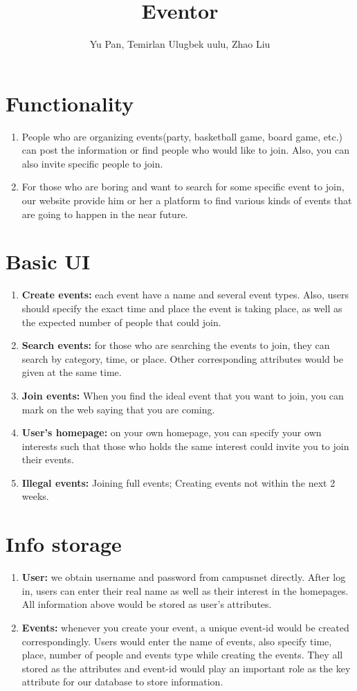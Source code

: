 \documentclass{article}
\author{Yu Pan, Temirlan Ulugbek uulu, Zhao Liu}
\title{Eventor}
\begin{document}
	\maketitle
	\section*{Functionality}
	\begin{enumerate}
		\item People who are organizing events(party, basketball game, board game, etc.) can post the information or find people who would like to join. Also, you can also invite specific people to join.
		\item For those who are boring and want to search for some specific event to join, our website provide him or her a platform to find various kinds of events that are going to happen in the near future.
	\end{enumerate}
	\section*{Basic UI}
	\begin{enumerate}
		\item \textbf{Create events:} each event have a name and several event types. Also, users should specify the exact time and  place the event is taking place, as well as the expected number of people that could join.
		\item \textbf{Search events:} for those who are searching the events to join, they can search by category, time, or place. Other corresponding attributes would be given at the same time.
		\item \textbf{Join events:} When you find the ideal event that you want to join, you can mark on the web saying that you are coming.
		\item \textbf{User's homepage:} on your own homepage, you can specify your own interests such that those who holds the same interest could invite you to join their events.
		\item \textbf{Illegal events:} Joining full events; Creating events not within the next 2 weeks.
	\end{enumerate}
	\section*{Info storage}
	\begin{enumerate}
		\item \textbf{User:} we obtain username and password from campusnet directly. After log in, users can enter their real name as well as their interest in the homepages. All information above would be stored as user's attributes.
		\item \textbf{Events:} whenever you create your event, a unique event-id would be created correspondingly. Users would enter the name of events, also specify time, place, number of people and events type while creating the events. They all stored as the attributes and event-id would play an important role as the key attribute for our database to store information.
	\end{enumerate}
\end{document}
